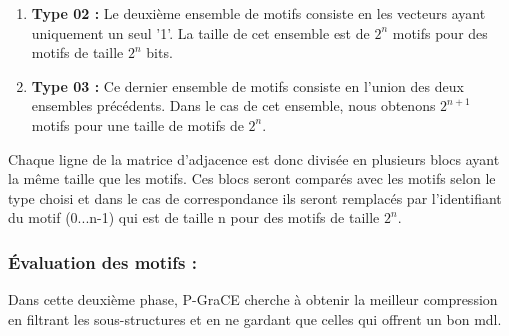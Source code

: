 \documentclass[a4paper,oneside,12pt]{report}
\theoremstyle{definition}
\begin{document}
\begin{enumerate}
\begin{enumerate}[label=(\alph*)]
		\item \textbf{Type 02 :} Le deuxième ensemble de motifs consiste en les vecteurs ayant uniquement un seul '1'. La taille de cet ensemble est de $2^n$ motifs pour des motifs de taille $2^n$ bits.
		\item \textbf{Type 03 :}  Ce dernier ensemble de motifs consiste en l'union des deux ensembles précédents. Dans le cas de cet ensemble, nous obtenons $2^{n+1}$ motifs pour une taille de motifs de $2^n$.
	\end{enumerate}	

Chaque ligne de la matrice d'adjacence est donc divisée en plusieurs blocs ayant la même taille que les motifs. Ces blocs seront comparés avec les motifs selon le type choisi et dans le cas de correspondance ils seront remplacés par l'identifiant du motif (0...n-1) qui est de taille n pour des motifs de taille $2^n$.


	
\end{enumerate}
		
		\subsubsection{Évaluation des motifs :}
		
		 Dans cette deuxième phase, P-GraCE cherche à obtenir la meilleur compression en filtrant les sous-structures et en ne gardant que celles qui offrent un bon \gls{mdl}. 
		 
\end{document}
